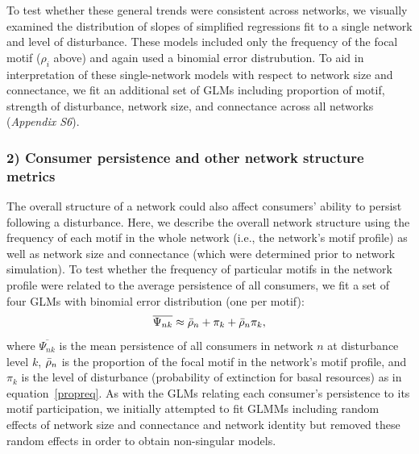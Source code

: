 \documentclass[12pt]{article}
\begin{document}
\begin{spacing}{2.0}
            
            To test whether these general trends were consistent across networks, we visually examined the distribution of slopes of simplified regressions fit to a single network and level of disturbance.
            These models included only the frequency of the focal motif ($\rho_{i}$ above) and again used a binomial error distrubution.
            To aid in interpretation of these single-network models with respect to network size and connectance, we fit an additional set of GLMs including proportion of motif, strength of disturbance, network size, and connectance across all networks (\emph{Appendix S6}).



        \subsubsection*{2) Consumer persistence and other network structure metrics}

            The overall structure of a network could also affect consumers' ability to persist following a disturbance.
            Here, we describe the overall network structure using the frequency of each motif in the whole network (i.e., the network's motif profile) as well as network size and connectance (which were determined prior to network simulation).
            To test whether the frequency of particular motifs in the network profile were related to the average persistence of all consumers, we fit a set of four GLMs with binomial error distribution (one per motif):
                \begin{equation}
                    \overline{\Psi_{nk}} \approx \Bar{\rho}_{n} + \pi_{k} + \Bar{\rho}_{n}\pi_{k},
                    \label{netpropeq}
                \end{equation}
            \noindent where $\overline{\Psi_{nk}}$ is the mean persistence of all consumers in network $n$ at disturbance level $k$, $\Bar{\rho}_{n}$ is the proportion of the focal motif in the network's motif profile, and $\pi_k$ is the level of disturbance (probability of extinction for basal resources) as in equation~\ref{propreq}.
            As with the GLMs relating each consumer's persistence to its motif participation, we initially attempted to fit GLMMs including random effects of network size and connectance and network identity but removed these random effects in order to obtain non-singular models.



\end{spacing}
\end{document}
